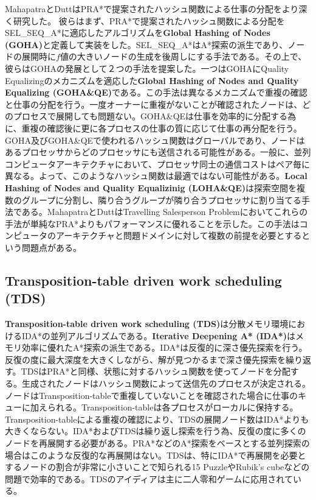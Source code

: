 \documentclass[uplatex]{jsarticle}
\begin{document}

MahapatraとDuttはPRA*で提案されたハッシュ関数による仕事の分配をより深く研究した\cite{mahapatra1997scalable}。
彼らはまず、PRA*で提案されたハッシュ関数による分配をSEL\_SEQ\_A*に適応したアルゴリズムを\textbf{Global Hashing of Nodes (GOHA)}と定義して実装をした。SEL\_SEQ\_A*はA*探索の派生であり、ノードの展開時に$f$値の大きいノードの生成を後周しにする手法である。その上で、彼らはGOHAの発展として２つの手法を提案した。一つはGOHAにQuality Equalizingのメカニズムを適応した\textbf{Global Hashing of Nodes and Quality Equalizing (GOHA\&QE)}である。この手法は異なるメカニズムで重複の確認と仕事の分配を行う。一度オーナーに重複がないことが確認されたノードは、どのプロセスで展開しても問題ない。GOHA\&QEは仕事を効率的に分配する為に、重複の確認後に更に各プロセスの仕事の質に応じて仕事の再分配を行う。GOHA及びGOHA\&QEで使われるハッシュ関数はグローバルであり、ノードはあるプロセッサからどのプロセッサにも送信される可能性がある。一般に、並列コンピュータアーキテクチャにおいて、プロセッサ同士の通信コストはペア毎に異なる。よって、このようなハッシュ関数は最適ではない可能性がある。\textbf{Local Hashing of Nodes and Quality Equalizinig (LOHA\&QE)}は探索空間を複数のグループに分割し、隣り合うグループが隣り合うプロセッサに割り当てる手法である。MahapatraとDuttはTravelling Salesperson Problemにおいてこれらの手法が単純なPRA*よりもパフォーマンスに優れることを示した。この手法はコンピュータのアーキテクチャと問題ドメインに対して複数の前提を必要とするという問題点がある。

\subsection{Transposition-table driven work scheduling (TDS)}
\textbf{Transposition-table driven work scheduling (TDS)}は分散メモリ環境におけるIDA*の並列アルゴリズムである\cite{romein1999transposition}。\textbf{Iterative Deepening A* (IDA*)}はメモリ効率に優れたA*探索の派生である\cite{Korf1985depth}。IDA*は反復的に深さ優先探索を行う。反復の度に最大深度を大きくしながら、解が見つかるまで深さ優先探索を繰り返す。TDSはPRA*と同様、状態に対するハッシュ関数を使ってノードを分配する。生成されたノードはハッシュ関数によって送信先のプロセスが決定される。ノードはTransposition-tableで重複していないことを確認された場合に仕事のキューに加えられる。Transposition-tableは各プロセスがローカルに保持する。Transposition-tableによる重複の確認により、TDSの展開ノード数はIDA*よりも大きくならない。IDA*およびTDSは繰り返し探索を行う為、反復の度に多くのノードを再展開する必要がある。PRA*などのA*探索をベースとする並列探索の場合はこのような反復的な再展開はない。TDSは、特にIDA*で再展開を必要とするノードの割合が非常に小さいことで知られる15 PuzzleやRubik's cubeなどの問題で効率的である。TDSのアイディアは主に二人零和ゲームに応用されている。
\end{document}
